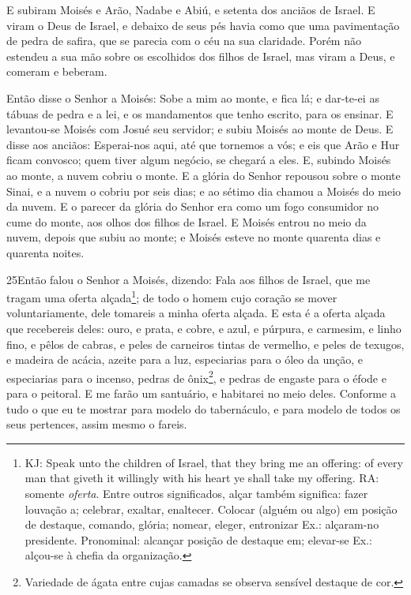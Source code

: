 E subiram Moisés e Arão, Nadabe e Abiú, e setenta dos anciãos de
Israel. E viram o Deus de Israel, e debaixo de seus pés havia
como que uma pavimentação de pedra de safira, que se parecia com o
céu na sua claridade. Porém não estendeu a sua mão sobre os
escolhidos dos filhos de Israel, mas viram a Deus, e comeram e
beberam.

Então disse o Senhor a Moisés: Sobe a mim ao monte, e fica lá; e
dar-te-ei as tábuas de pedra e a lei, e os mandamentos que tenho
escrito, para os ensinar. E levantou-se Moisés com Josué seu
servidor; e subiu Moisés ao monte de Deus. E disse aos
anciãos: Esperai-nos aqui, até que tornemos a vós; e eis que Arão e
Hur ficam convosco; quem tiver algum negócio, se chegará a eles.
E, subindo Moisés ao monte, a nuvem cobriu o monte. E
a glória do Senhor repousou sobre o monte Sinai, e a nuvem o cobriu
por seis dias; e ao sétimo dia chamou a Moisés do meio da nuvem.
E o parecer da glória do Senhor era como um fogo consumidor
no cume do monte, aos olhos dos filhos de Israel. E Moisés
entrou no meio da nuvem, depois que subiu ao monte; e Moisés esteve
no monte quarenta dias e quarenta noites.

\medskip

\lettrine{25} Então falou o Senhor a Moisés, dizendo: Fala
aos filhos de Israel, que me tragam uma oferta alçada\footnote{KJ:
Speak unto the children of Israel, that they bring me an offering:
of every man that giveth it willingly with his heart ye shall take
my offering. RA: somente \emph{oferta}. Entre outros significados,
alçar também significa: fazer louvação a; celebrar, exaltar,
enaltecer. Colocar (alguém ou algo) em posição de destaque, comando,
glória; nomear, eleger, entronizar Ex.: alçaram-no presidente.
Pronominal: alcançar posição de destaque em; elevar-se Ex.: alçou-se
à chefia da organização.}; de todo o homem cujo coração se mover
voluntariamente, dele tomareis a minha oferta alçada. E esta é a
oferta alçada que recebereis deles: ouro, e prata, e cobre, e
azul, e púrpura, e carmesim, e linho fino, e pêlos de cabras, e
peles de carneiros tintas de vermelho, e peles de texugos, e madeira
de acácia, azeite para a luz, especiarias para o óleo da unção,
e especiarias para o incenso, pedras de ônix\footnote{Variedade
de ágata entre cujas camadas se observa sensível destaque de cor.},
e pedras de engaste para o éfode e para o peitoral. E me farão
um santuário, e habitarei no meio deles. Conforme a tudo o que
eu te mostrar para modelo do tabernáculo, e para modelo de todos os
seus pertences, assim mesmo o fareis.

